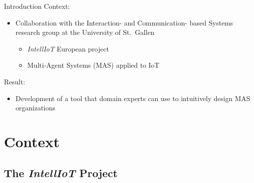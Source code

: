 \begin{frame}{Introduction}
    Context:
    \begin{itemize}
        \item Collaboration with the Interaction- and Communication-
        based Systems research group at the University of St.\ Gallen
        \begin{itemize}
            \item \emph{IntellIoT} European project
            \item Multi-Agent Systems (MAS) applied to IoT
        \end{itemize}
    \end{itemize}
    \vspace{1cm}
    Result:
    \begin{itemize}
        \item Development of a tool that domain experts can use to
        intuitively design MAS organizations
    \end{itemize}
\end{frame}

\section{Context}
\subsection{The \textit{IntellIoT} Project}

